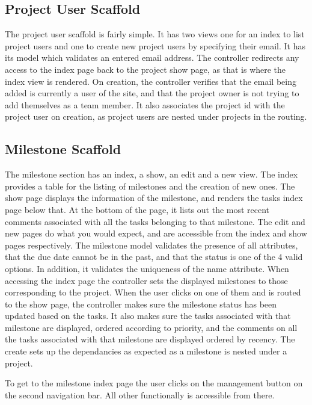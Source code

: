 \documentclass[a4wide, 11pt]{article}
\begin{document}
\subsection{Project User Scaffold}
The project user scaffold is fairly simple. It has two views one for an index to list project users and one to create new project users by specifying their email. It has its model which validates an entered email address. The controller redirects any access to the index page back to the project show page, as that is where the index view is rendered. On creation, the controller verifies that the email being added is currently a user of the site, and that the project owner is not trying to add themselves as a team member. It also associates the project id with the project user on creation, as project users are nested under projects in the routing.
\clearpage

\subsection{Milestone Scaffold}
The milestone section has an index, a show, an edit and a new view. The index provides a table for the listing of milestones and the creation of new ones. The show page displays the information of the milestone, and renders the tasks index page below that. At the bottom of the page, it lists out the most recent comments associated with all the tasks belonging to that milestone. The edit and new pages do what you would expect, and are accessible from the index and show pages respectively. The milestone model validates the presence of all attributes, that the due date cannot be in the past, and that the status is one of the 4 valid options. In addition, it validates the uniqueness of the name attribute. When accessing the index page the controller sets the displayed milestones to those corresponding to the project. When the user clicks on one of them and is routed to the show page, the controller makes sure the milestone status has been updated based on the tasks. It also makes sure the tasks associated with that milestone are displayed, ordered according to priority, and the comments on all the tasks associated with that milestone are displayed ordered by recency. The create sets up the dependancies as expected as a milestone is nested under a project. 

To get to the milestone index page the user clicks on the management button on the second navigation bar. All other functionally is accessible from there.
\end{document}
